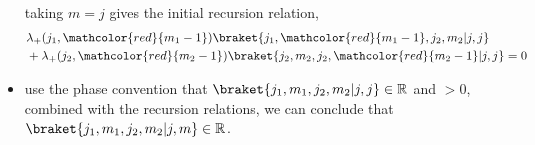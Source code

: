 \begin{itemize}
	taking $m = j$ gives the initial recursion relation,
	\begin{align}
		& \lambda_+(j_1, \mathcolor{red}{m_1 - 1}) \braket{j_1, \mathcolor{red}{m_1 - 1}, j_2, m_2 | j, j} \notag \\
		& + \lambda_+(j_2, \mathcolor{red}{m_2 - 1}) \braket{j_2, m_2, j_2, \mathcolor{red}{m_2 - 1} | j, j} = 0
	\end{align}
	
	\item use the phase convention that $\braket{j_1, m_1, j_2, m_2 | j, j} \in \mathbb{R}$ and $> 0$, combined with the recursion relations, we can conclude that $\braket{j_1, m_1, j_2, m_2 | j, m} \in \mathbb{R}$.
\end{itemize}
